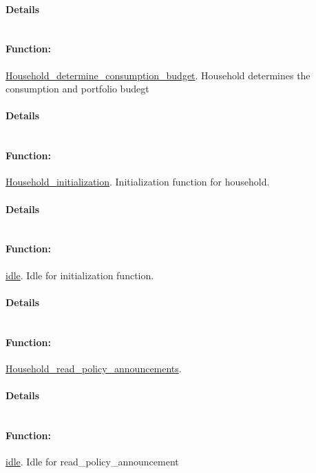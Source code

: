 \documentclass[a4paper,11pt]{article}
\begin{document}
\paragraph{Details}
\begin{verbatim}
\end{verbatim}
\paragraph{Function:}\url{Household_determine_consumption_budget}.
Household determines the consumption and portfolio budegt
\paragraph{Details}
\begin{verbatim}
\end{verbatim}
\paragraph{Function:}\url{Household_initialization}.
Initialization function for household.
\paragraph{Details}
\begin{verbatim}
\end{verbatim}
\paragraph{Function:}\url{idle}.
Idle for initialization function.
\paragraph{Details}
\begin{verbatim}
\end{verbatim}
\paragraph{Function:}\url{Household_read_policy_announcements}.

\paragraph{Details}
\begin{verbatim}
\end{verbatim}
\paragraph{Function:}\url{idle}.
Idle for read\_policy\_announcement
\end{document}
